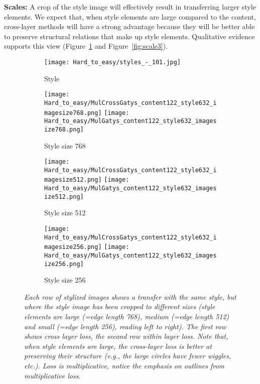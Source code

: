 \documentclass[runningheads]{llncs}
\begin{document}
{\bf Scales:}  A crop of the style image will effectively result in transferring larger style elements.  We expect that,
when style elements are large compared to the content, cross-layer methods will have a strong advantage because they
will be better able to preserve structural relations that make up style elements.   Qualitative evidence supports this
view (Figure~\ref{fig:scale2} and Figure~\ref{fig:scale3}).

\begin{figure}[h!]
  \centering %
	\begin{subfigure}[b]{0.157\linewidth}
    \texttt{[image: Hard\_to\_easy/styles\_-\_101.jpg]}
    \caption{Style}
  \end{subfigure}
  \begin{subfigure}[b]{0.27\linewidth}
    \texttt{[image: Hard\_to\_easy/MulCrossGatys\_content122\_style632\_imagesize768.png]}
    \texttt{[image: Hard\_to\_easy/MulGatys\_content122\_style632\_imagesize768.png]}
    \caption{Style size 768}
  \end{subfigure}
  \begin{subfigure}[b]{0.27\linewidth}
    \texttt{[image: Hard\_to\_easy/MulCrossGatys\_content122\_style632\_imagesize512.png]}
    \texttt{[image: Hard\_to\_easy/MulGatys\_content122\_style632\_imagesize512.png]}
    \caption{Style size 512}
  \end{subfigure} 
  \begin{subfigure}[b]{0.27\linewidth}
    \texttt{[image: Hard\_to\_easy/MulCrossGatys\_content122\_style632\_imagesize256.png]}
    \texttt{[image: Hard\_to\_easy/MulGatys\_content122\_style632\_imagesize256.png]}
    \caption{Style size 256}
  \end{subfigure}

  \caption{\em  Each row of stylized images shows a  transfer with the same style, but where the style image has been cropped to
    different sizes (style elements are {\em large} (=edge length 768), {\em medium} (=edge length 512) and {\em small}
    (=edge length 256), reading left to right).  The first row shows cross layer loss, the second row within layer loss.
    Note that, when style elements are large, the cross-layer loss is better at preserving their structure (e.g.,
  the large circles have fewer wiggles, etc.). Loss is multiplicative, notice the emphasis on outlines from multiplicative loss.
  }
  \label{fig:scale2}
\end{figure}
\end{document}
